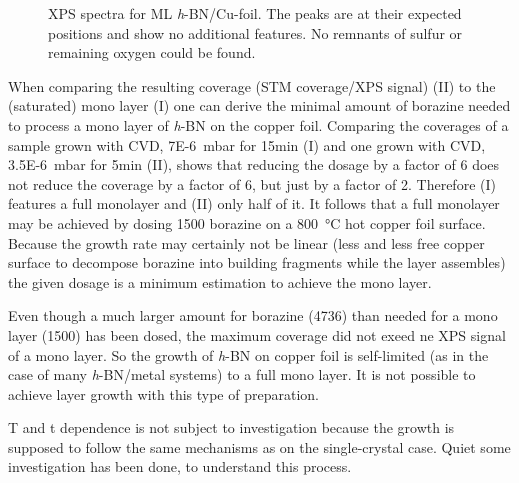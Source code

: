 \begin{figure}[!h]
{	}
	\caption{XPS spectra for ML \textit{h}-BN/Cu-foil. The peaks are at their expected positions\cite{kidambi_situ_2014} and show no additional features. No remnants of sulfur or remaining oxygen could be found.}
	\label{fig:xps-self-grown}
\end{figure}

When comparing the resulting coverage (STM coverage/XPS signal) (II) to the (saturated) mono layer (I) one can derive the minimal amount of borazine needed to process a mono layer of \textit{h}-BN on the copper foil. Comparing the coverages of a sample grown with CVD, \SI{7E-6}{\milli \bar} for 15min (I) and one grown with CVD, \SI{3.5E-6}{\milli \bar} for 5min (II), shows that reducing the dosage by a factor of 6 does not reduce the coverage by a factor of 6, but just by a factor of 2. Therefore (I) features a full monolayer and (II) only half of it. It follows that a full monolayer may be achieved by dosing \SI{1500}{\langmuir} borazine on a \SI{800}{\degreeCelsius} hot copper foil surface. 
Because the growth rate may certainly not be linear (less and less free copper surface to decompose borazine into building fragments while the layer assembles) the given dosage is a minimum estimation to achieve the mono layer.

Even though a much larger amount for borazine (\SI{4736}{\langmuir}) than needed for a mono layer (\SI{1500}{\langmuir}) has been dosed, the maximum coverage did not exeed ne XPS signal of a mono layer. So the growth of \textit{h}-BN on copper foil is self-limited (as in the case of many \textit{h}-BN/metal systems) to a full mono layer. It is not possible to achieve layer growth with this type of preparation.

T and t dependence is not subject to investigation because the growth is supposed to follow the same mechanisms as on the single-crystal case. Quiet some investigation has been done, \cite{orlando_epitaxial_2012,preobrajenski_monolayer_2007-1} to understand this process.

